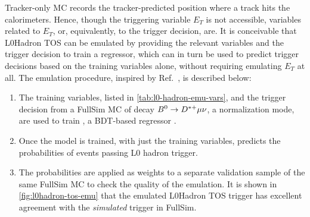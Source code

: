 Tracker-only MC records the tracker-predicted position where a track hits the
calorimeters.
Hence, though the triggering variable $E_T$ is not accessible,
variables related to $E_T$, or, equivalently, to the trigger decision, are.
It is conceivable that L0Hadron TOS can be emulated by providing
the relevant variables and the trigger decision to train a regressor,
which can in turn be used to predict trigger decisions based on the training
variables alone, without requiring emulating $E_T$ at all.
The emulation procedure, inspired by Ref.~\cite{LHCb-INT-2019-025}, is
described below:

\begin{enumerate}
    \item The training variables, listed in \cref{tab:l0-hadron-emu-vars}, and
        the trigger decision from a FullSim MC of decay
        ${{B}^0} \rightarrow {\ensuremath{{D}^{*+}}} \mu \nu$, a normalization mode,
        are used to train \xgboost, a BDT-based regressor
        \cite{Chen:2016:XST:2939672.2939785}.
    \item Once the model is trained, with just the training variables,
        \xgboost predicts the probabilities of events passing L0 hadron trigger.
    \item The probabilities are applied as weights to a separate validation
        sample of the same FullSim MC to check the quality of the emulation.
        It is shown in \cref{fig:l0hadron-tos-emu} that the emulated L0Hadron
        TOS trigger has excellent agreement with the \emph{simulated} trigger in
        FullSim.
\end{enumerate}

